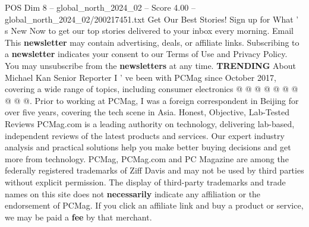 \begin{textsample}{POS Dim 8 – global\_north\_2024\_02 – Score 4.00 – global\_north\_2024\_02/200217451.txt}
Get Our Best Stories!
Sign up for What ' s New Now to get our top stories delivered to your inbox every morning.
Email This \textbf{newsletter} may contain advertising, deals, or affiliate links.
Subscribing to a \textbf{newsletter} indicates your consent to our Terms of Use and Privacy Policy.
You may unsubscribe from the \textbf{newsletters} at any time. \textbf{TRENDING} About Michael Kan Senior Reporter I ' ve been with PCMag since October 2017, covering a wide range of topics, including consumer electronics @ @ @ @ @ @ @ @ @ @.
Prior to working at PCMag, I was a foreign correspondent in Beijing for over five years, covering the tech scene in Asia.
Honest, Objective, Lab-Tested Reviews PCMag.com is a leading authority on technology, delivering lab-based, independent reviews of the latest products and services.
Our expert industry analysis and practical solutions help you make better buying decisions and get more from technology.
PCMag, PCMag.com and PC Magazine are among the federally registered trademarks of Ziff Davis and may not be used by third parties without explicit permission.
The display of third-party trademarks and trade names on this site does not \textbf{necessarily} indicate any affiliation or the endorsement of PCMag.
If you click an affiliate link and buy a product or service, we may be paid a \textbf{fee} by that merchant.

\end{textsample}
